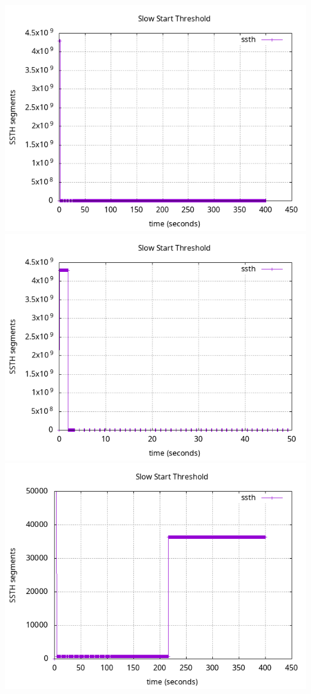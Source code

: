 \documentclass{article}
\begin{document}
\includegraphics[scale=0.5]{plots/lab1-group5-task1-experimentA-question1.1.png}
\includegraphics[scale=0.5]{plots/lab1-group5-task1-experimentA-question1.1-xrange-0-50.png}
\includegraphics[scale=0.5]{plots/lab1-group5-task1-experimentA-question1.1-yrange-0-50000.png}
\end{document}
